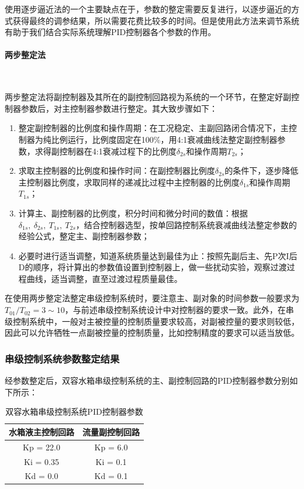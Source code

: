 \documentclass[UTF8]{article}
\begin{document}
使用逐步逼近法的一个主要缺点在于，参数的整定需要反复进行，以逐步逼近的方式获得最终的调参结果，所以需要花费比较多的时间。但是使用此方法来调节系统有助于我们结合实际系统理解PID控制器各个参数的作用。

\paragraph{两步整定法}~{}

两步整定法将副控制器及其所在的副控制回路视为系统的一个环节，在整定好副控制器参数后，对主控制器参数进行整定。其大致步骤如下：
\begin{enumerate}
    \item 整定副控制器的比例度和操作周期：在工况稳定、主副回路闭合情况下，主控制器为纯比例运行，比例度固定在100\%，用4:1衰减曲线法整定副控制器参数，求得副控制器在4:1衰减过程下的比例度$\delta_{2s}$和操作周期$T_{2s}$；
    \item 求取主控制器的比例度和操作时间：在副控制器比例度$\delta_{2s}$的条件下，逐步降低主控制器比例度，求取同样的递减比过程中主控制器的比例度$\delta_{1s}$和操作周期$T_{1s}$；
    \item 计算主、副控制器的比例度，积分时间和微分时间的数值：根据$\delta_{1s},\ \delta_{2s},\ T_{1s},\ T_{2s}$，结合控制器选型，按单回路控制系统衰减曲线法整定参数的经验公式，整定主、副控制器参数；
    \item 必要时进行适当调整，知道系统质量达到最佳为止：按照先副后主、先P次I后D的顺序，将计算出的参数值设置到控制器上，做一些扰动实验，观察过渡过程曲线，适当调整，直至过渡过程质量最佳。
\end{enumerate}

在使用两步整定法整定串级控制系统时，要注意主、副对象的时间参数一般要求为$T_{01}/T_{02} = 3\sim 10$，与前述串级控制系统设计中对控制器的要求一致。此外，在串级控制系统中，一般对主被控量的控制质量要求较高，对副被控量的要求则较低，因此可以允许牺牲一点副被控量的控制质量，比如控制精度的要求可以适当放低。

\subsubsection{串级控制系统参数整定结果}
经参数整定后，双容水箱串级控制系统的主、副控制回路的PID控制器参数分别如下所示：
\begin{table}[H] %
\centering %
\begin{tabular}{cc} %
	\toprule %
	水箱液主控制回路 & 流量副控制回路 \\
	\midrule %
	Kp = 22.0 &  Kp = 6.0\\
	Ki = 0.35 & Ki = 0.1 \\
	Kd = 0.0 & Kd = 0.1 \\
	\bottomrule %
\end{tabular}
\caption{双容水箱串级控制系统PID控制器参数} %
\end{table}
\end{document}
